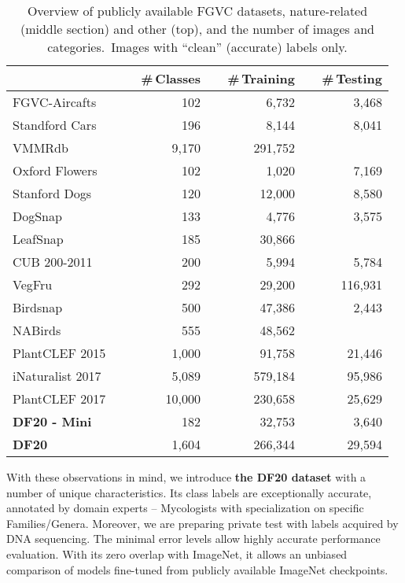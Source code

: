 \documentclass[10pt,twocolumn,letterpaper]{article}
\begin{document}
\begin{table}[b]
\small
\vspace{-0.2cm}
\begin{center}
\renewcommand{\arraystretch}{1.0}
\setlength{\tabcolsep}{0.4em}
\begin{tabular}{|l|r|r|r|}
\cline{2-4}
\multicolumn{1}{l|}{ } & ~~\#\,Classes & ~~\#\,Training & ~~\#\,Testing \\
\hline
FGVC-Aircafts\,\cite{aircafts}              &  102   &  6,732  &  3,468   \\
Standford Cars\,\cite{dataset-Cars}          &  196   &  8,144  &  8,041   \\
VMMRdb\,\cite{vmmrdb}                        &  9,170    &  291,752  &     \\
\hline
Oxford Flowers\,\cite{dataset-flower}                 &    102 &   1,020 &   7,169  \\
Stanford Dogs\,\cite{dogsnap_dataset}                 &    120 &  12,000 &   8,580  \\
DogSnap\,\cite{dogsnap_dataset}                       &    133 &   4,776 &   3,575  \\
LeafSnap\,\cite{leafsnap}                             &    185 &  30,866 &  \\
CUB 200-2011\,\cite{dataset-CUBS}                     &    200 &   5,994 &   5,784  \\
VegFru\,\cite{vegfru_dataset}                         &    292 &  29,200 & 116,931  \\
Birdsnap\,\cite{dataset-birdsnap}                     &    500 &  47,386 &   2,443  \\
NABirds\,\cite{nabirds_dataset}                       &    555 &  48,562 &  \\
PlantCLEF 2015\,\cite{plantclef2015}                  &  1,000 &  91,758 &  21,446  \\
iNaturalist 2017\,\cite{inaturalist2017}              &  5,089 & 579,184 &  95,986  \\
PlantCLEF 2017{}\,\cite{plantclef2017}~ & 10,000 & 230,658 &  25,629  \\
\hline \hline
\textbf{DF20 - Mini}        &    182 &  32,753 &   3,640  \\
\textbf{DF20}               &  1,604 & 266,344 &  29,594  \\
\hline
\end{tabular}
\end{center}
\caption{Overview of publicly available FGVC datasets, nature-related (middle section) and other (top), and the number of images and categories. {}\,Images with ``clean'' (accurate) labels only.}
\label{table:fgvc_datasets}
\end{table}
With these observations in mind, we introduce {\bf the DF20 dataset} with a number of unique characteristics. Its class labels are exceptionally accurate, annotated by domain experts -- Mycologists with specialization on specific Families/Genera. Moreover, we are preparing private test with labels acquired by DNA sequencing. The minimal error levels allow highly accurate performance evaluation. 
With its zero overlap with ImageNet, it allows an unbiased comparison of models fine-tuned from publicly available ImageNet checkpoints.
\end{document}
